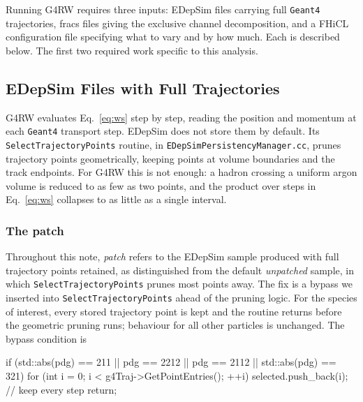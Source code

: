 \documentclass[%
article,
nofootinbib
]{revtex4-2}
\DeclareRobustCommand{\gfour}{\texttt{Geant4}}
\begin{document}
Running G4RW requires three inputs: EDepSim files carrying full \gfour{}
trajectories, fracs files giving the exclusive channel decomposition, and a
FHiCL configuration file specifying what to vary and by how much. Each is
described below. The first two required work specific to this analysis.

\subsection{\label{subsec:edepsim_patch}EDepSim Files with Full Trajectories}


G4RW evaluates Eq.~\ref{eq:ws} step by step, reading the position and momentum
at each \gfour{} transport step. EDepSim does not store them by default. Its \texttt{SelectTrajectoryPoints} routine, in
\texttt{EDepSimPersistencyManager.cc}, prunes trajectory points
geometrically, keeping points at volume boundaries and the track endpoints.
For G4RW this is not enough: a hadron crossing a uniform argon volume is
reduced to as few as two points, and the product over steps in
Eq.~\ref{eq:ws} collapses to as little as a single interval.

\subsubsection{The patch}

Throughout this note, \emph{patch} refers to the EDepSim sample produced
with full trajectory points retained, as distinguished from the default
\emph{unpatched} sample, in which \texttt{SelectTrajectoryPoints} prunes
most points away.
The fix is a bypass we inserted into \texttt{SelectTrajectoryPoints} ahead
of the pruning logic. For the species of interest, every stored trajectory
point is kept and the routine returns before the geometric pruning runs;
behaviour for all other particles is unchanged. The bypass condition is

\begin{bashcode}
if (std::abs(pdg) == 211 || pdg == 2212 ||
    pdg == 2112 || std::abs(pdg) == 321) {
    for (int i = 0; i < g4Traj->GetPointEntries(); ++i)
        selected.push_back(i);   // keep every step
    return;
}
\end{bashcode}
\end{document}
